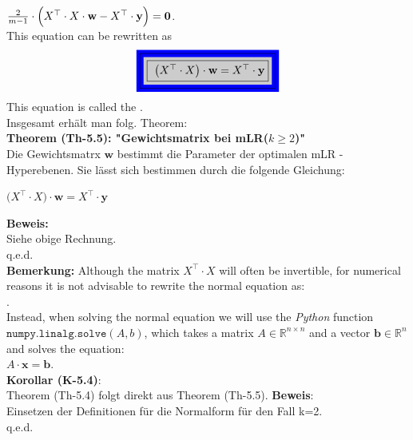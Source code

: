 \documentclass[12pt]{article}
\begin{document}
\hspace*{1.3cm}
$ \frac{2}{m-1} \cdot \Bigl(X^\top \cdot X \cdot \mathbf{w} - X^\top \cdot \mathbf{y}\Bigr) = \mathbf{0}$.
\\[0.2cm]
This equation can be rewritten as
\begin{equation}
  \label{eq:normal-equation}
 \colorbox{blue}{\framebox{\colorbox{gray!40}{\framebox{
 $ \bigl(X^\top \cdot X\bigr) \cdot \mathbf{w} = X^\top \cdot \mathbf{y}$}}}} 
\end{equation}
This equation is called the {\color{blue}{normal equation}}.  \\
%
Insgesamt erhält man folg. Theorem: \\[0.5cm]
\textbf{Theorem (Th-5.5): "Gewichtsmatrix bei mLR($k\geqslant 2$)"} \\[0.3cm]
Die Gewichtsmatrx $\mathbf{w}$ bestimmt die Parameter der optimalen mLR - Hyperebenen. Sie lässt sich bestimmen durch die folgende Gleichung:\\[0.3cm]
\begin{center}
\begin{large}
$ \bigl(X^\top \cdot X\bigr) \cdot \mathbf{w} = X^\top \cdot \mathbf{y}$
\end{large}
\end{center} 
\textbf{Beweis:}\\
Siehe obige Rechnung. \\
q.e.d. \\[0.5cm]
%
\textbf{Bemerkung:}
Although the matrix $X^\top \cdot X$ will often be invertible, for numerical reasons it is not
advisable to rewrite the normal equation as:
\\[0.2cm]
\hspace*{4.8cm}
\colorbox{black}{}.
\\[0.2cm]
Instead, when solving the normal equation we will use the \textsl{Python} function $\texttt{numpy.linalg.solve}(A,b)$, which
takes a matrix $A \in \mathbb{R}^{n \times n}$ and a vector $\mathbf{b} \in \mathbb{R}^n$ and solves the equation:
\\[0.2cm]
\hspace*{5.3cm}
$A \cdot \mathbf{x} = \mathbf{b}$. \\[0.5cm]
%
\textbf{Korollar (K-5.4)}:\\ 
Theorem (Th-5.4) folgt direkt aus Theorem (Th-5.5). 
%
\textbf{Beweis}:\\
Einsetzen der Definitionen für die Normalform für den Fall k=2. \\    
q.e.d.\\[0.5cm]
\end{document}
